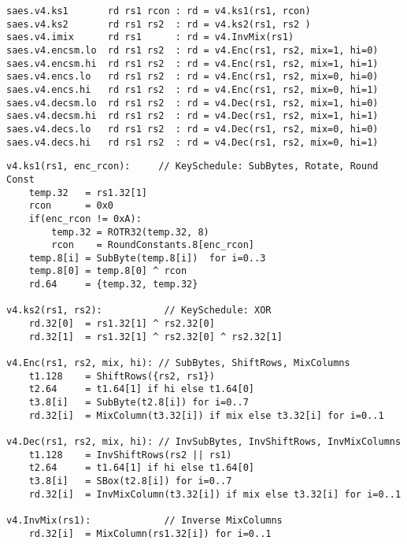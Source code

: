 

\begin{lstlisting}[language=pseudo,style=block]
saes.v4.ks1       rd rs1 rcon : rd = v4.ks1(rs1, rcon)
saes.v4.ks2       rd rs1 rs2  : rd = v4.ks2(rs1, rs2 )
saes.v4.imix      rd rs1      : rd = v4.InvMix(rs1)
saes.v4.encsm.lo  rd rs1 rs2  : rd = v4.Enc(rs1, rs2, mix=1, hi=0)
saes.v4.encsm.hi  rd rs1 rs2  : rd = v4.Enc(rs1, rs2, mix=1, hi=1)
saes.v4.encs.lo   rd rs1 rs2  : rd = v4.Enc(rs1, rs2, mix=0, hi=0)
saes.v4.encs.hi   rd rs1 rs2  : rd = v4.Enc(rs1, rs2, mix=0, hi=1)
saes.v4.decsm.lo  rd rs1 rs2  : rd = v4.Dec(rs1, rs2, mix=1, hi=0)
saes.v4.decsm.hi  rd rs1 rs2  : rd = v4.Dec(rs1, rs2, mix=1, hi=1)
saes.v4.decs.lo   rd rs1 rs2  : rd = v4.Dec(rs1, rs2, mix=0, hi=0)
saes.v4.decs.hi   rd rs1 rs2  : rd = v4.Dec(rs1, rs2, mix=0, hi=1)
\end{lstlisting}


\begin{lstlisting}[language=pseudo,style=block]
v4.ks1(rs1, enc_rcon):     // KeySchedule: SubBytes, Rotate, Round Const
    temp.32   = rs1.32[1]
    rcon      = 0x0
    if(enc_rcon != 0xA):
        temp.32 = ROTR32(temp.32, 8)
        rcon    = RoundConstants.8[enc_rcon]
    temp.8[i] = SubByte(temp.8[i])  for i=0..3
    temp.8[0] = temp.8[0] ^ rcon
    rd.64     = {temp.32, temp.32}

v4.ks2(rs1, rs2):           // KeySchedule: XOR
    rd.32[0]  = rs1.32[1] ^ rs2.32[0]
    rd.32[1]  = rs1.32[1] ^ rs2.32[0] ^ rs2.32[1]

v4.Enc(rs1, rs2, mix, hi): // SubBytes, ShiftRows, MixColumns
    t1.128    = ShiftRows({rs2, rs1})
    t2.64     = t1.64[1] if hi else t1.64[0]
    t3.8[i]   = SubByte(t2.8[i]) for i=0..7
    rd.32[i]  = MixColumn(t3.32[i]) if mix else t3.32[i] for i=0..1

v4.Dec(rs1, rs2, mix, hi): // InvSubBytes, InvShiftRows, InvMixColumns
    t1.128    = InvShiftRows(rs2 || rs1)
    t2.64     = t1.64[1] if hi else t1.64[0]
    t3.8[i]   = SBox(t2.8[i]) for i=0..7
    rd.32[i]  = InvMixColumn(t3.32[i]) if mix else t3.32[i] for i=0..1

v4.InvMix(rs1):             // Inverse MixColumns
    rd.32[i]  = MixColumn(rs1.32[i]) for i=0..1
\end{lstlisting}


